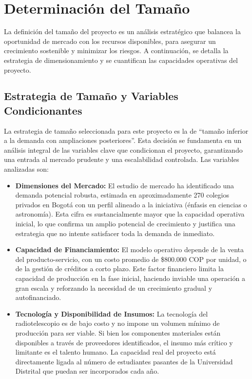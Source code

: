 \section{Determinación del Tamaño}

La definición del tamaño del proyecto es un análisis estratégico que balancea la
oportunidad de mercado con los recursos disponibles, para asegurar un
crecimiento sostenible y minimizar los riesgos. A continuación, se detalla la
estrategia de dimensionamiento y se cuantifican las capacidades operativas del
proyecto.

\subsection{Estrategia de Tamaño y Variables Condicionantes}

La estrategia de tamaño seleccionada para este proyecto es la de ``tamaño
inferior a la demanda con ampliaciones posteriores''. Esta decisión se
fundamenta en un análisis integral de las variables clave que condicionan el
proyecto, garantizando una entrada al mercado prudente y una escalabilidad
controlada. Las variables analizadas son:

\begin{itemize}
  \item \textbf{Dimensiones del Mercado:} El estudio de mercado ha identificado
    una demanda potencial robusta, estimada en aproximadamente 270 colegios
    privados en Bogotá con un perfil alineado a la iniciativa (énfasis en
    ciencias o astronomía). Esta cifra es sustancialmente mayor que la capacidad
    operativa inicial, lo que confirma un amplio potencial de crecimiento y
    justifica una estrategia que no intente satisfacer toda la demanda de
    inmediato.

  \item \textbf{Capacidad de Financiamiento:} El modelo operativo depende de la
    venta del producto-servicio, con un costo promedio de \$800.000 COP por
    unidad, o de la gestión de créditos a corto plazo. Este factor financiero
    limita la capacidad de producción en la fase inicial, haciendo inviable una
    operación a gran escala y reforzando la necesidad de un crecimiento gradual
    y autofinanciado.

  \item \textbf{Tecnología y Disponibilidad de Insumos:} La tecnología del
    radiotelescopio es de bajo costo y no impone un volumen mínimo de producción
    para ser viable. Si bien los componentes materiales están disponibles a
    través de proveedores identificados, el insumo más crítico y limitante es el
    talento humano. La capacidad real del proyecto está directamente ligada al
    número de estudiantes pasantes de la Universidad Distrital que puedan ser
    incorporados cada año.
\end{itemize}

